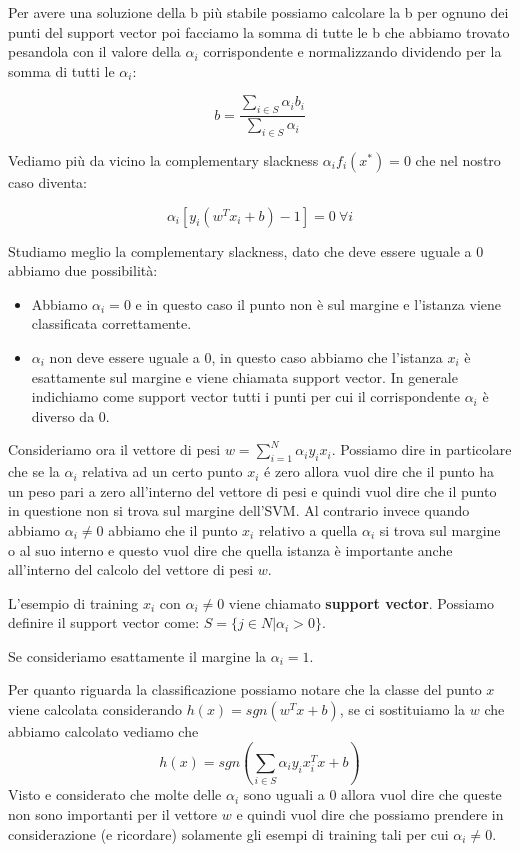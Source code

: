 \documentclass[14pt]{extreport}
\begin{document}
Per avere una soluzione della b più stabile possiamo calcolare la b per ognuno dei punti del support vector poi facciamo la somma di tutte le b che
abbiamo trovato pesandola con il valore della $\alpha_i$ corrispondente e normalizzando dividendo per la somma di tutti le $\alpha_i$:

$$b = \frac{\sum_{i \in S}\alpha_i b_i}{\sum_{i \in S}\alpha_i}$$


Vediamo più da vicino la complementary slackness $\alpha_if_i(x^*)=0$ che nel nostro caso diventa:

$$\alpha_i[y_i(w^Tx_i+b)-1]=0 \ \forall i$$

Studiamo meglio la complementary slackness, dato che deve essere uguale a 0 abbiamo due possibilità:
\begin{itemize}
\item Abbiamo $\alpha_i=0$ e in questo caso il punto non è sul margine e l'istanza viene classificata correttamente.
\item $\alpha_i$ non deve essere uguale a 0, in questo caso abbiamo che l'istanza $x_i$ è esattamente sul margine e viene chiamata support vector. In
generale indichiamo come support vector tutti i punti per cui il corrispondente $\alpha_i$ è diverso da 0.
\end{itemize}

Consideriamo ora il vettore di pesi $w=\sum_{i=1}^N \alpha_iy_ix_i$. Possiamo dire in particolare che se la $\alpha_i$  relativa ad un certo punto
$x_i$ é zero allora vuol dire che il punto ha un peso pari a zero all'interno del vettore di pesi e quindi vuol dire che il punto in questione non si
trova sul margine dell'SVM. Al contrario invece quando abbiamo $\alpha_i \not = 0$ abbiamo che il punto $x_i$ relativo a quella $\alpha_i$ si trova
sul margine o al suo interno e questo vuol dire che quella istanza è importante anche all'interno del calcolo del vettore di pesi $w$.


L'esempio di training $x_i$ con $\alpha_i \not = 0$ viene chiamato \textbf{support vector}. Possiamo definire il support vector come: $S = \{j \in N |
\alpha_i > 0\}$.

Se consideriamo esattamente il margine la $\alpha_i = 1$.


Per quanto riguarda la classificazione possiamo notare che la classe del punto $x$ viene calcolata considerando $h(x) = sgn(w^Tx+b)$, se ci
sostituiamo la $w$ che abbiamo calcolato vediamo che
$$h(x)=sgn(\sum_{i \in S}\alpha_iy_ix_i^Tx+b)$$ Visto e considerato che molte delle $\alpha_i$ sono uguali a 0 allora vuol dire che queste non sono
importanti per il vettore $w$ e quindi vuol dire che possiamo prendere in considerazione (e ricordare) solamente gli esempi di training tali per cui
$\alpha_i \not = 0$.
\end{document}
